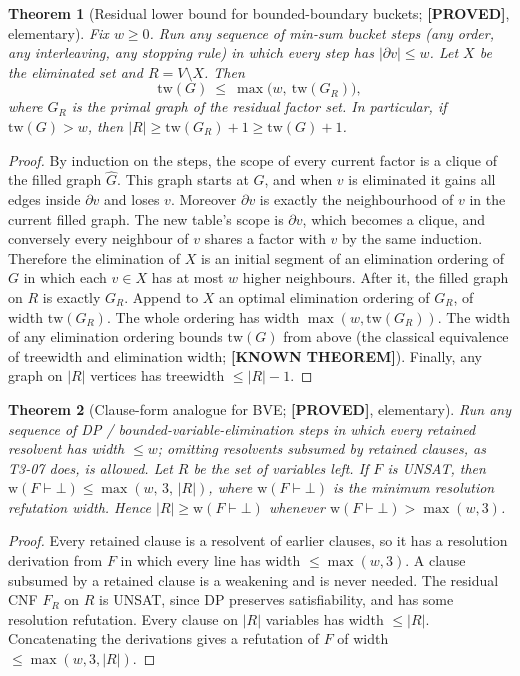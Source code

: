 \documentclass[11pt]{article}
\newtheorem{theorem}{Theorem}
\theoremstyle{definition}
\theoremstyle{remark}
\newcommand{\lab}[1]{\textbf{[#1]}}
\newcommand{\tw}{\mathrm{tw}}
\begin{document}
\begin{theorem}[Residual lower bound for bounded-boundary buckets; \lab{PROVED}, elementary]\label{thm:tw}
Fix $w\ge0$. Run any sequence of min-sum bucket steps (any order, any interleaving, any
stopping rule) in which every step has $|\partial v|\le w$. Let $X$ be the eliminated set
and $R=V\setminus X$. Then
\[ \tw(G)\ \le\ \max\bigl(w,\ \tw(G_R)\bigr),\]
where $G_R$ is the primal graph of the residual factor set. In particular, if
$\tw(G)>w$, then $|R|\ge\tw(G_R)+1\ge\tw(G)+1$.
\end{theorem}
\begin{proof}
By induction on the steps, the scope of every current factor is a clique of the filled
graph $\widehat G$. This graph starts at $G$, and when $v$ is eliminated it gains all
edges inside $\partial v$ and loses $v$. Moreover $\partial v$ is exactly the neighbourhood
of $v$ in the current filled graph. The new table's scope is $\partial v$, which becomes a
clique, and conversely every neighbour of $v$ shares a factor with $v$ by the same
induction. Therefore the elimination of $X$ is an initial segment of an elimination
ordering of $G$ in which each $v\in X$ has at most $w$ higher neighbours. After it, the
filled graph on $R$ is exactly $G_R$. Append to $X$ an optimal elimination ordering of
$G_R$, of width $\tw(G_R)$. The whole ordering has width $\max(w,\tw(G_R))$. The width
of any elimination ordering bounds $\tw(G)$ from above (the classical equivalence of
treewidth and elimination width; \lab{KNOWN THEOREM}). Finally, any graph on $|R|$
vertices has treewidth $\le|R|-1$.
\end{proof}

\begin{theorem}[Clause-form analogue for BVE; \lab{PROVED}, elementary]\label{thm:bve}
Run any sequence of DP / bounded-variable-elimination steps in which every retained
resolvent has width $\le w$; omitting resolvents subsumed by retained clauses, as T3-07
does, is allowed. Let $R$ be the set of variables left. If $F$ is UNSAT, then
$\mathrm{w}(F\vdash\bot)\le\max(w,\,3,\,|R|)$, where $\mathrm{w}(F\vdash\bot)$ is the
minimum resolution refutation width. Hence $|R|\ge\mathrm{w}(F\vdash\bot)$ whenever
$\mathrm{w}(F\vdash\bot)>\max(w,3)$.
\end{theorem}
\begin{proof}
Every retained clause is a resolvent of earlier clauses, so it has a resolution derivation
from $F$ in which every line has width $\le\max(w,3)$. A clause subsumed by a retained
clause is a weakening and is never needed. The residual CNF $F_R$ on $R$ is UNSAT, since DP
preserves satisfiability, and has some resolution refutation. Every clause on $|R|$
variables has width $\le|R|$. Concatenating the derivations gives a refutation of $F$ of
width $\le\max(w,3,|R|)$.
\end{proof}
\end{document}
